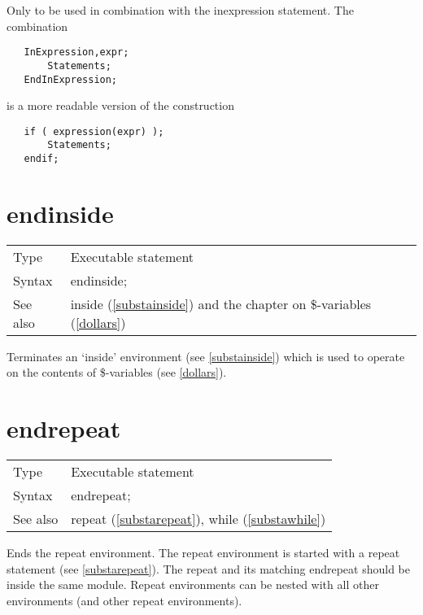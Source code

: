 \noindent Only to be used in combination with the 
inexpression statement. The 
combination
\begin{verbatim}
   InExpression,expr;
       Statements;
   EndInExpression;
\end{verbatim}
is a more readable version of the construction
\begin{verbatim}
   if ( expression(expr) );
       Statements;
   endif;
\end{verbatim}
\vspace{10mm}


\section{endinside}
\label{substaendinside}

\noindent \begin{tabular}{ll}
Type & Executable statement\\
Syntax & endinside;
\\ See also & inside (\ref{substainside}) and the chapter on \$-variables 
(\ref{dollars})
\end{tabular}\vspace{4mm}

\noindent Terminates an `inside' 
environment (see \ref{substainside}) which is 
used to operate on the contents of \$-variables (see 
\ref{dollars}).\vspace{10mm}


\section{endrepeat}
\label{substaendrepeat}

\noindent \begin{tabular}{ll}
Type & Executable statement\\
Syntax & endrepeat;
\\ See also & repeat (\ref{substarepeat}), while (\ref{substawhile})
\end{tabular} \vspace{4mm}

\noindent Ends the repeat 
environment. The repeat environment is started 
with a repeat statement (see \ref{substarepeat}). The repeat and its 
matching endrepeat should be inside the same module. 
Repeat environments can be nested with all other environments (and other 
repeat environments). \vspace{10mm}

